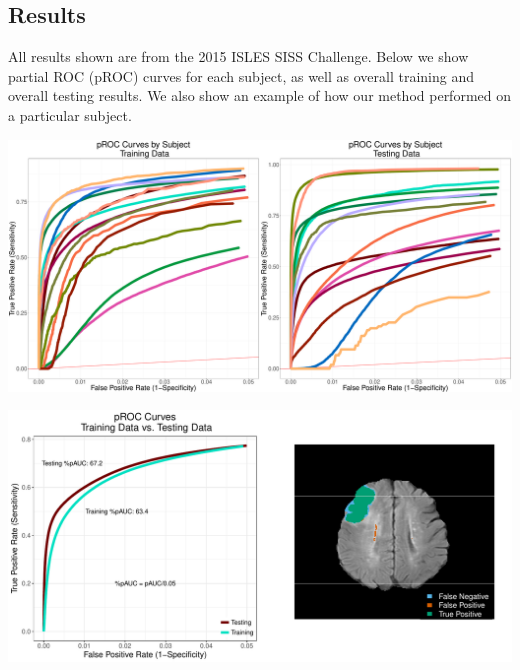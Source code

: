 \documentclass[a0,landscape]{a0poster}
\begin{document}
\begin{multicols}{3}
\large{\section*{\color{uwred}Results}}
\noindent All results shown are from the 2015 ISLES SISS Challenge. Below we show partial ROC (pROC) curves for each subject, as well as overall training and overall testing results. We also show an example of how our method performed on a particular subject.

\begin{center}\vspace{.5cm}
\includegraphics[width=1\linewidth]{procbysubject.pdf}
\end{center}\vspace{.5cm}


\begin{center}\vspace{.5cm}
\includegraphics[width=1\linewidth]{combined.pdf}
\end{center}\vspace{.5cm}


\end{multicols}
\end{document}
